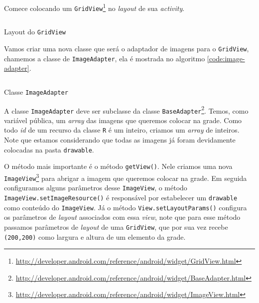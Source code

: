 \documentclass[a4paper,12pt,brazil]{book}
\begin{document}
\begin{singlespace}
Comece colocando um \texttt{GridView}\footnote{\href{http://developer.android.com/reference/android/widget/GridView.html}{http://developer.android.com/reference/android/widget/GridView.html}} no \emph{layout} de sua \emph{activity}.

\begin{listing}[H]
\inputminted[linenos=true,fontsize=\small,frame=lines, framesep=2mm, tabsize=2,numbersep=5pt]{xml}{src/design/gridview.xml}
\caption{Layout do \texttt{GridView}}
\end{listing}	

Vamos criar uma nova classe que será o adaptador de imagens para o \texttt{GridView}, chamemos a classe de \texttt{ImageAdapter}, ela é mostrada no algoritmo \ref{code:image-adapter}.

\begin{listing}[H]
\inputminted[linenos=true,fontsize=\small,frame=lines, framesep=2mm, tabsize=2,numbersep=5pt]{java}{src/design/imageadapter.java}
\caption{Classe \texttt{ImageAdapter}}
\label{code:image-adapter}
\end{listing}	

A classe \texttt{ImageAdapter} deve ser subclasse da classe \texttt{BaseAdapter}\footnote{\href{http://developer.android.com/reference/android/widget/BaseAdaptfer.html}{http://developer.android.com/reference/android/widget/BaseAdapter.html}}. Temos, como variável pública, um \emph{array} das imagens que queremos colocar na grade. Como todo \emph{id} de um recurso da classe \texttt{R} é um inteiro, criamos um \emph{array} de inteiros. Note que estamos considerando que todas as imagens já foram devidamente colocadas na pasta \texttt{drawable}.

O método mais importante é o método \texttt{getView()}. Nele criamos uma nova \texttt{ImageView}\footnote{\href{http://developer.android.com/reference/android/widget/ImageView.html}{http://developer.android.com/reference/android/widget/ImageView.html}} para abrigar a imagem que queremos colocar na grade. Em seguida configuramos alguns parâmetros desse \texttt{ImageView}, o método \texttt{ImageView.setImageResource()} é responsável por estabelecer um \texttt{drawable} como conteúdo do \texttt{ImageView}. Já o método \texttt{View.setLayoutParams()} configura os parâmetros de \emph{layout} associados com essa \emph{view}, note que para esse método passamos parâmetros de \emph{layout} de uma \texttt{GridView}, que por sua vez recebe \texttt{(200,200)} como largura e altura de um elemento da grade.


\end{singlespace}
\end{document}
